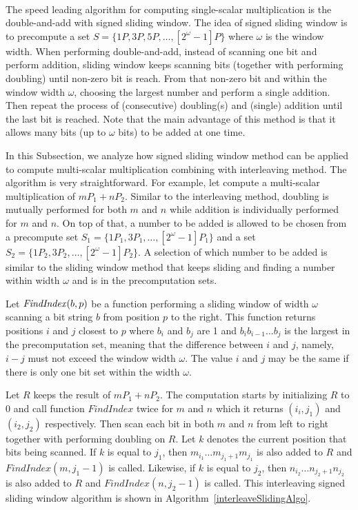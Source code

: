  \\
\label{sec:signedslide}
The speed leading algorithm for computing single-scalar multiplication is the double-and-add with signed sliding window.
The idea of signed sliding window is to precompute a set $S = \{1P, 3P, 5P, \dots, [2^{\omega}-1]P\}$ where $\omega$ is the window width.
When performing double-and-add, instead of scanning one bit and perform addition,
sliding window keeps scanning bits (together with performing doubling) until non-zero bit is reach.
From that non-zero bit and within the window width $\omega$, choosing the largest number and perform a single addition.
Then repeat the process of (consecutive) doubling(s) and (single) addition until the last bit is reached.
Note that the main advantage of this method is that it allows many bits (up to $\omega$ bits) to be added at one time.

In this Subsection, we analyze how signed sliding window method can be applied to compute multi-scalar multiplication combining with interleaving method.
The algorithm is very straightforward.  For example, let compute a multi-scalar multiplication of $mP_1 + nP_2$.
Similar to the interleaving method, doubling is mutually performed for both $m$ and $n$ while addition is individually performed for $m$ and $n$.
On top of that, a number to be added is allowed to be chosen from a precompute set $S_1 = \{1P_1, 3P_1, \dots, [2^{\omega}-1]P_1\}$
and a set $S_2 = \{1P_2, 3P_2, \dots, [2^{\omega}-1]P_2\}$.
A selection of which number to be added is similar to the sliding window method that keeps sliding and finding a number within width $\omega$ and is in the precomputation sets.

Let ${\it{FindIndex}}(b,p)$ be a function performing a sliding window of width $\omega$ scanning a bit string $b$ from position $p$ to the right.
This function returns positions $i$ and $j$ closest to $p$ where $b_i$ and $b_j$ are 1 and $b_i b_{i-1} \dots b_j$ is the largest in the precomputation set,
meaning that the difference between $i$ and $j$, namely, $i-j$ must not exceed the window width $\omega$.
The value $i$ and $j$ may be the same if there is only one bit set within the width $\omega$.

Let $R$ keeps the result of $mP_1 + nP_2$.  The computation starts by initializing $R$ to $0$ and call function $FindIndex$ twice for $m$ and $n$
which it returns $(i_i,j_1)$ and $(i_2,j_2)$ respectively.
Then scan each bit in both $m$ and $n$ from left to right together with performing doubling on $R$.
Let $k$ denotes the current position that bits being scanned.
If $k$ is equal to $j_1$, then $m_{i_1} \dots m_{{j_1}+1} m_{j_1}$ is also added to $R$ and $FindIndex(m,j_1-1)$ is called.
Likewise, if $k$ is equal to $j_2$, then $n_{i_2} \dots n_{{j_2}+1} n_{j_2}$ is also added to $R$ and $FindIndex(n,j_2-1)$ is called.
This interleaving signed sliding window algorithm is shown in Algorithm~\ref{interleaveSlidingAlgo}.

